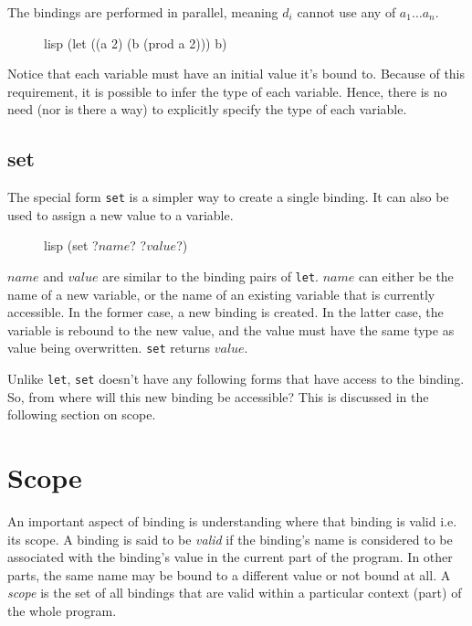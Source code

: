 \documentclass[a4paper, 12pt]{article}
\begin{document}
The bindings are performed in parallel, meaning $d_i$ cannot use any of $a_1 \ldots a_n$.

\begin{figure}[htp]
    \centering
    \begin{cminted}[autogobble=true]{lisp}
        (let ((a 2) (b (prod a 2))) b)
    \end{cminted}
    \captionsetup[figure]{font=small}
\end{figure}

Notice that each variable must have an initial value it's bound to. Because of this requirement, it is possible to infer the type of each variable. Hence, there is no need (nor is there a way) to explicitly specify the type of each variable.

\subsection{set}
The special form \texttt{set} is a simpler way to create a single binding. It can also be used to assign a new value to a variable.

\begin{figure}[htp]
    \centering
    \begin{cminted}[autogobble=true, escapeinside=??]{lisp}
        (set ?$name$? ?$value$?)
    \end{cminted}
    \captionsetup[figure]{font=small}
\end{figure}

$name$ and $value$ are similar to the binding pairs of \texttt{let}. $name$ can either be the name of a new variable, or the name of an existing variable that is currently accessible. In the former case, a new binding is created. In the latter case, the variable is rebound to the new value, and the value must have the same type as value being overwritten. \texttt{set} returns $value$.

Unlike \texttt{let}, \texttt{set} doesn't have any following forms that have access to the binding. So, from where will this new binding be accessible? This is discussed in the following section on scope.

\section{Scope} \label{subsec:scope}
An important aspect of binding is understanding where that binding is valid i.e. its scope. A binding is said to be \textit{valid} if the binding's name is considered to be associated with the binding's value in the current part of the program. In other parts, the same name may be bound to a different value or not bound at all. A \textit{scope} is the set of all bindings that are valid within a particular context (part) of the whole program.
\end{document}
